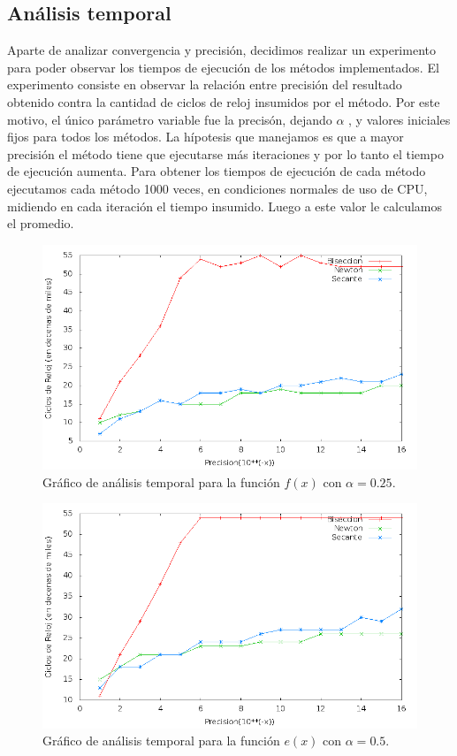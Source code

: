 \subsection{An\'alisis temporal}

Aparte de analizar convergencia y precisi\'on, decidimos realizar un experimento para poder observar los tiempos de ejecuci\'on de los m\'etodos implementados. El experimento consiste en observar la relaci\'on entre precisi\'on del resultado obtenido contra la cantidad de ciclos de reloj insumidos por el m\'etodo. Por este motivo, el \'unico par\'ametro variable fue la precis\'on, dejando $\alpha$ , y valores iniciales fijos para todos los m\'etodos. La h\'ipotesis que manejamos es que a mayor precisi\'on el m\'etodo tiene que ejecutarse m\'as iteraciones y por lo tanto el tiempo de ejecuci\'on aumenta. Para obtener los tiempos de ejecuci\'on de cada m\'etodo ejecutamos cada m\'etodo 1000 veces, en condiciones normales de uso de CPU, midiendo en cada iteraci\'on el tiempo insumido. Luego a este valor le calculamos el promedio. 

\begin{figure}[H]
	\includegraphics[scale = 0.5]{../Imagenes/tiempos/tiempos_precision_f.png}
	\caption{Gr\'afico de an\'alisis temporal para la funci\'on $f(x)$ con $\alpha = 0.25$.}
\end{figure}

\begin{figure}[H]
	\includegraphics[scale = 0.5]{../Imagenes/tiempos/tiempos_precision_e.png}
	\caption{Gr\'afico de an\'alisis temporal para la funci\'on $e(x)$ con $\alpha = 0.5$.}
\end{figure}


